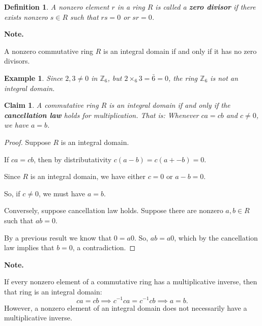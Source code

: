 \documentclass[a4paper,12pt]{report}
\newcounter{statement}
\numberwithin{statement}{chapter}
\newtheorem{defn}[statement]{Definition}
\newtheorem{claim}[statement]{Claim}
\newtheorem{eg}[statement]{\bf Example}
\numberwithin{equation}{chapter}
\numberwithin{section}{chapter}
\numberwithin{subsection}{section}
\begin{document}
\begin{defn}

A nonzero element $r$ in a ring $R$ is called a  {\bf  zero divisor}  if
there exists nonzero $s \in R$ such that $rs = 0$ or $sr = 0$.

\end{defn}



 {\bf Note.} 

A nonzero commutative ring $R$ is an integral domain if and only if
it has no zero divisors.




\begin{eg}

Since $2, 3 \neq 0$ in $\mathbb{Z}_6$, but
$2 \times_6 3 = \bar{6} = 0$,
the ring $\mathbb{Z}_6$ is not an integral domain.

\end{eg}







\begin{claim}
A commutative ring $R$ is an integral domain if and only if
the  {\bf cancellation law}  holds for multiplication.  That is:
Whenever $ca = cb$ and $c\neq 0$, we have $a = b$.
\end{claim}
\begin{proof}

Suppose $R$ is an integral domain.




If $ca = cb$, then by distributativity $c(a - b) = c(a + -b) = 0$.




Since $R$ is an integral domain,
we have either $c = 0$ or $a - b = 0$.




So, if $c \neq 0$, we must have
$a = b$.




Conversely, suppose cancellation law holds.  Suppose there are nonzero $a, b \in R$
such that $ab = 0$.




By a previous result we know that $0 = a0$.
So, $ab = a0$, which by the cancellation law implies that $b = 0$, a contradiction.


\end{proof}



 {\bf Note.} 

If every nonzero element of a commutative ring has a multiplicative inverse,
then that ring is an integral domain:
\[
ca = cb \implies c^{-1} ca = c^{-1}cb\implies a = b.
\]
However, a nonzero element of an integral domain does not
necessarily have a multiplicative inverse.
\end{document}
